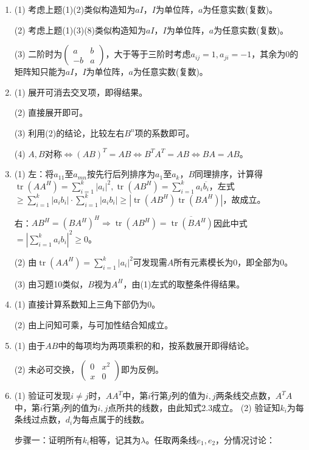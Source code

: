 \documentclass[a4paper,UTF8,fontset=windows]{ctexart}
\DeclareMathOperator{\tr}{tr}
\begin{document}
\begin{enumerate}
\item
(1) 考虑上题(1)(2)类似构造知为$aI$，$I$为单位阵，$a$为任意实数(复数)。

(2) 考虑上题(1)(3)(8)类似构造知为$aI$，$I$为单位阵，$a$为任意实数(复数)。

(3) 二阶时为$\begin{pmatrix}a&b\\-b&a\end{pmatrix}$，大于等于三阶时考虑$a_{ij}=1,a_{ji}=-1$，其余为0的矩阵知只能为$aI$，$I$为单位阵，$a$为任意实数(复数)。

\item
(1) 展开可消去交叉项，即得结果。

(2) 直接展开即可。

(3) 利用(2)的结论，比较左右$B^n$项的系数即可。

(4) $A,B$对称$\Leftrightarrow(AB)^T=AB\Leftrightarrow B^TA^T=AB\Leftrightarrow BA=AB$。

\item
(1) 左：将$a_{11}$至$a_{mn}$按先行后列排序为$a_1$至$a_k$，$B$同理排序，计算得$\tr (AA^H)=\sum_{i=1}^{k}|a_i|^2,\tr (AB^H)=\sum_{i=1}^{k}{a_i\overline{b_i}}$，左式$\ge\sum_{i=1}^{k}|a_ib_i|\cdot\sum_{i=1}^{k}|a_ib_i|\ge\left|\tr(AB^H)\tr(BA^H)\right|$，故成立。

右：$AB^H=(BA^H)^H\Rightarrow \tr(AB^H)=\overline{\tr(BA^H)}$因此中式$=\left|\sum_{i=1}^{k}a_ib_i\right|^2\ge0$。

(2) 由$\tr(AA^H)=\sum_{i=1}^{k}|a_i|^2$可发现需$A$所有元素模长为0，即全部为0。

(3) 由习题10类似，$B$视为$A^H$，由(1)左式的取整条件得结果。

\item
(1) 直接计算系数知上三角下部仍为0。

(2) 由上问知可乘，与可加性结合知成立。

\item
(1) 由于$AB$中的每项均为两项乘积的和，按系数展开即得结论。

(2) 未必可交换，$\begin{pmatrix}0&x^2\\x&0\end{pmatrix}$即为反例。

\item
(1) 验证可发现$i\ne j$时，$AA^T$中，第$i$行第$j$列的值为$i,j$两条线交点数，$A^TA$中，第$i$行第$j$列的值为$i,j$点所共的线数，由此知式2.3成立。
(2) 验证知$k_i$为每条线过点数，$d_i$为每点属于的线数。

步骤一：证明所有$k_i$相等，记其为$\lambda$。任取两条线$e_1,e_2$，分情况讨论：


\end{enumerate}
\end{document}

